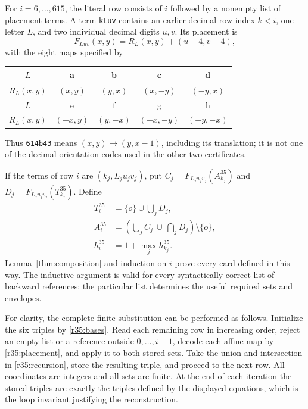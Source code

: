 For \(i=6,\ldots,615\), the literal row consists of \(i\) followed by a
nonempty list of placement terms.  A term \texttt{kLuv} contains an
earlier decimal row index \(k<i\), one letter \(L\), and two individual
decimal digits \(u,v\).  Its placement is
\begin{equation}\label{r35:placement}
 F_{Luv}(x,y)=R_L(x,y)+(u-4,v-4),
\end{equation}
with the eight maps specified by
\begin{center}
\small
\begin{tabular}{c|cccc}
\(L\)&a&b&c&d\\ \hline
\(R_L(x,y)\)&\((x,y)\)&\((y,x)\)&\((x,-y)\)&\((-y,x)\)\\[3pt]
\(L\)&e&f&g&h\\ \hline
\(R_L(x,y)\)&\((-x,y)\)&\((y,-x)\)&\((-x,-y)\)&\((-y,-x)\)
\end{tabular}
\end{center}
Thus \texttt{614b43} means \((x,y)\mapsto(y,x-1)\), including its
translation; it is not one of the decimal orientation codes used in the
other two certificates.

If the terms of row \(i\) are \((k_j,L_ju_jv_j)\), put
\(C_j=F_{L_ju_jv_j}(A_{k_j}^{35})\) and
\(D_j=F_{L_ju_jv_j}(T_{k_j}^{35})\).  Define
\begin{equation}\label{r35:recursion}
 \begin{split}
 T_i^{35}&=\{o\}\cup\bigcup_j D_j,\\
 A_i^{35}&=\left(\bigcup_j C_j\ \cup\ \bigcap_jD_j\right)
             \setminus\{o\},\\
 h_i^{35}&=1+\max_j h_{k_j}^{35}.
 \end{split}
\end{equation}
Lemma~\ref{thm:composition} and induction on \(i\) prove every card
defined in this way.  The inductive argument is valid for every
syntactically correct list of backward references; the particular list
determines the useful required sets and envelopes.

For clarity, the complete finite substitution can be performed as
follows.  Initialize the six triples by \eqref{r35:bases}.  Read each
remaining row in increasing order, reject an empty list or a reference
outside \(0,\ldots,i-1\), decode each affine map by
\eqref{r35:placement}, and apply it to both stored sets.  Take the union
and intersection in \eqref{r35:recursion}, store the resulting triple,
and proceed to the next row.  All coordinates are integers and all sets
are finite.  At the end of each iteration the stored triples are
exactly the triples defined by the displayed equations, which is the
loop invariant justifying the reconstruction.


